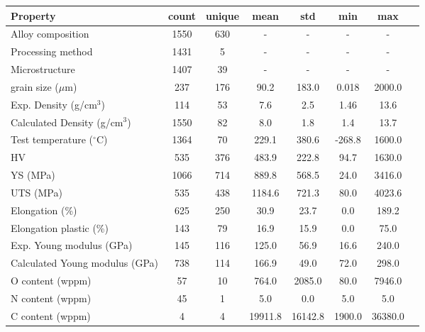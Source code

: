 \begin{tabular}{lccccccc}
\toprule
Property & count & unique & mean & std & min & max \\
\midrule
Alloy composition & 1550 & 630 & - & - & - & - \\
Processing method & 1431 & 5 & - & - & - & - \\
Microstructure & 1407 & 39 & - & - & - & - \\
grain size ($\mu$m) & 237 & 176 & 90.2 & 183.0 & 0.018 & 2000.0 \\
Exp. Density (g/cm$^3$) & 114 & 53 & 7.6 & 2.5 & 1.46 & 13.6 \\
Calculated Density (g/cm$^3$) & 1550 & 82 & 8.0 & 1.8 & 1.4 & 13.7 \\
Test temperature ($^\circ$C) & 1364 & 70 & 229.1 & 380.6 & -268.8 & 1600.0 \\
HV & 535 & 376 & 483.9 & 222.8 & 94.7 & 1630.0 \\
YS (MPa) & 1066 & 714 & 889.8 & 568.5 & 24.0 & 3416.0 \\
UTS (MPa) & 535 & 438 & 1184.6 & 721.3 & 80.0 & 4023.6 \\
Elongation (\%) & 625 & 250 & 30.9 & 23.7 & 0.0 & 189.2 \\
Elongation plastic (\%) & 143 & 79 & 16.9 & 15.9 & 0.0 & 75.0 \\
Exp. Young modulus (GPa) & 145 & 116 & 125.0 & 56.9 & 16.6 & 240.0 \\
Calculated Young modulus (GPa) & 738 & 114 & 166.9 & 49.0 & 72.0 & 298.0 \\
O content (wppm) & 57 & 10 & 764.0 & 2085.0 & 80.0 & 7946.0 \\
N content (wppm) & 45 & 1 & 5.0 & 0.0 & 5.0 & 5.0 \\
C content (wppm) & 4 & 4 & 19911.8 & 16142.8 & 1900.0 & 36380.0 \\
\bottomrule
\end{tabular}
